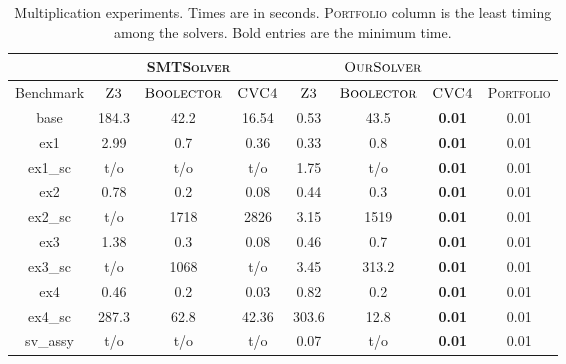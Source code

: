 \begin{table}[t]
\centering
\caption{Multiplication experiments. Times are in seconds.
\textsc{Portfolio} column is the least timing among the solvers. Bold entries are the minimum time.}
\label{my-label}
\begin{tabular}{|c|c|c|c|c|c|c|c|}
\hline
                      & \multicolumn{3}{c|}{\textsc{SMTSolver}}                    & \multicolumn{3}{c|}{$\textsc{OurSolver}$}  &                             \\ \hline
Benchmark             & $\textsc{Z3}$ & $\textsc{Boolector}$ & $\textsc{CVC4}$ & $\textsc{Z3}$ & $\textsc{Boolector}$ & $\textsc{CVC4}$ & \textsc{Portfolio} \\ \hline
base                  & 184.3    & 42.2         & 16.54        & 0.53      & 43.5         & \textbf{0.01}       & 0.01                 \\ \hline
ex1                   & 2.99      & 0.7          & 0.36                     & 0.33      & 0.8          & \textbf{0.01}       & 0.01                 \\ \hline
ex1\_sc         & t/o       & t/o          & t/o                         & 1.75      & t/o          & \textbf{0.01}       & 0.01                 \\ \hline
ex2                   & 0.78      & 0.2          & 0.08                     & 0.44      & 0.3          & \textbf{0.01}       & 0.01                 \\ \hline
ex2\_sc         & t/o       & 1718       & 2826               & 3.15      & 1519       & \textbf{0.01}       & 0.01                 \\ \hline
ex3                   & 1.38      & 0.3          & 0.08                      & 0.46      & 0.7          & \textbf{0.01}       & 0.01                 \\ \hline
ex3\_sc         & t/o       & 1068       & t/o                     & 3.45      & 313.2        & \textbf{0.01}       & 0.01                 \\ \hline
ex4         & 0.46      & 0.2          & 0.03                      & 0.82      & 0.2          & \textbf{0.01}       & 0.01                 \\ \hline
ex4\_sc     & 287.3    & 62.8         & 42.36                  & 303.6    & 12.8         & \textbf{0.01}       & 0.01                 \\ \hline
sv\_assy              & t/o       & t/o          & t/o                        & 0.07      & t/o          & \textbf{0.01}       & 0.01                 \\ \hline

\end{tabular}
\end{table}
